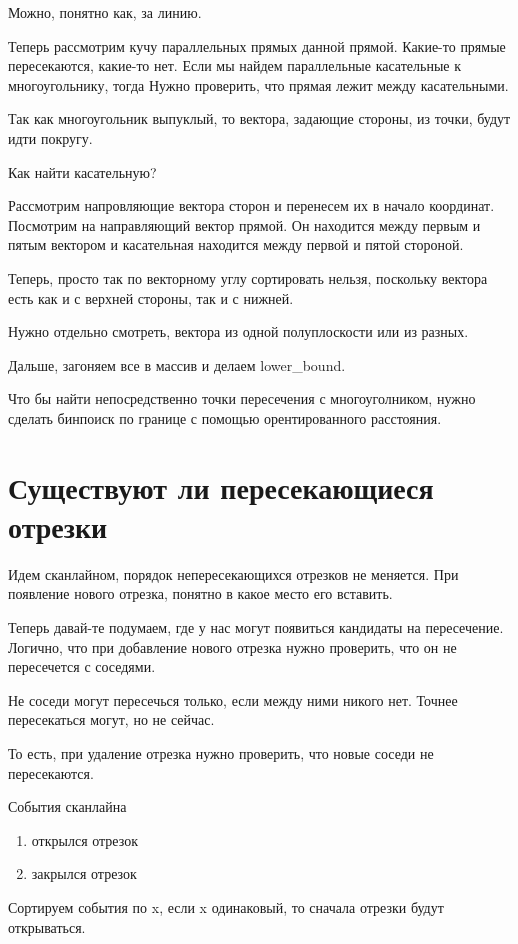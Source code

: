 Можно, понятно как, за линию.

Теперь рассмотрим кучу параллельных прямых данной прямой. Какие-то прямые пересекаются, какие-то нет.
Если мы найдем параллельные касательные к многоугольнику, тогда
Нужно проверить, что прямая лежит между касательными.

Так как многоугольник выпуклый, то вектора, задающие стороны, из точки, будут идти покругу.

Как найти касательную?

Рассмотрим напровляющие вектора сторон и перенесем их в начало координат. 
Посмотрим на направляющий вектор прямой. Он находится между первым и пятым вектором и касательная находится между первой и пятой стороной.

Теперь, просто так по векторному углу сортировать нельзя, поскольку вектора есть как и с верхней стороны, так и с нижней. 

Нужно отдельно смотреть, вектора из одной полуплоскости или из разных.

Дальше, загоняем все в массив и делаем lower\_bound.

Что бы найти непосредственно точки пересечения с многоуголником, нужно сделать бинпоиск по границе с помощью орентированного расстояния.

\section{Существуют ли пересекающиеся отрезки} 

Идем сканлайном, порядок  непересекающихся отрезков не меняется. При появление нового отрезка, понятно в какое место его вставить. 

Теперь давай-те подумаем, где у нас могут появиться кандидаты на пересечение. Логично, что при добавление нового
отрезка нужно проверить, что он не пересечется с соседями. 

Не соседи могут пересечься только, если между ними никого нет. Точнее пересекаться могут, но не сейчас. 

То есть, при удаление отрезка нужно проверить, что новые соседи не пересекаются. 

События сканлайна
\begin{enumerate}
\item открылся отрезок
\item закрылся отрезок
\end{enumerate}
Сортируем события по x, если x одинаковый, то сначала отрезки будут открываться.

